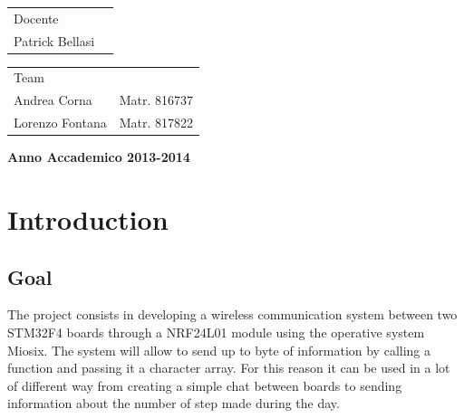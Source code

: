 \documentclass[11pt,a4paper,oneside]{article}
\begin{document}
\begin{center}
\begin{flushleft}
\begin{tabular}{l l }
Docente\\
Patrick Bellasi
\end{tabular}
\end{flushleft}
\vspace{10mm}


\begin{flushright}
\begin{tabular}{l l }
Team \\
Andrea Corna & Matr. 816737\\
Lorenzo Fontana & Matr. 817822\\
\end{tabular}
\end{flushright}

\vspace{43mm}
{\large{\bf Anno Accademico 2013-2014}}
\end{center}

\newpage

\tableofcontents


\newpage

\listoffigures

\newpage



\section{Introduction}

\subsection{Goal}
The project consists in developing a wireless communication system between two STM32F4 boards through a NRF24L01 module using the operative system Miosix. The system will allow to send up to byte of information by calling a  function and passing it a character array. For this reason it can be used in a lot of different way from creating a simple chat between boards to sending information about the number of step made during the day.
\end{document}
